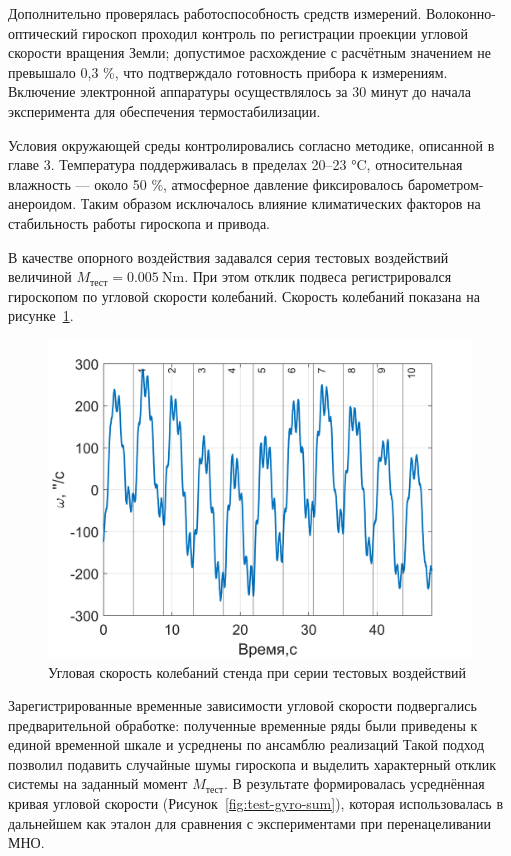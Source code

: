 Дополнительно проверялась работоспособность средств измерений. Волоконно-оптический гироскоп проходил контроль по регистрации проекции угловой скорости вращения Земли; допустимое расхождение с расчётным значением не превышало 0,3 \%, что подтверждало готовность прибора к измерениям. Включение электронной аппаратуры осуществлялось за 30 минут до начала эксперимента для обеспечения термостабилизации.

Условия окружающей среды контролировались согласно методике, описанной в главе 3. Температура поддерживалась в пределах 20–23 °C, относительная влажность — около 50 \%, атмосферное давление фиксировалось барометром-анероидом. Таким образом исключалось влияние климатических факторов на стабильность работы гироскопа и привода.

В качестве опорного воздействия задавался серия тестовых воздействий величиной $M_{\text{тест}} = \SI{0,005}{\newton\meter}$. При этом отклик подвеса регистрировался гироскопом по угловой скорости колебаний. Скорость колебаний показана на рисунке~\cref{fig:test-gyro}.

\begin{figure}[h!]
	\centering
	\includegraphics[scale=0.8]{matlab/img/test-gyro}
	\caption{Угловая скорость колебаний стенда при серии тестовых воздействий}
	\label{fig:test-gyro}
\end{figure}

Зарегистрированные временные зависимости угловой скорости подвергались предварительной обработке: полученные временные ряды были приведены к единой временной шкале и усреднены по ансамблю реализаций Такой подход позволил подавить случайные шумы гироскопа и выделить характерный отклик системы на заданный момент $M_{\text{тест}}$. В результате формировалась усреднённая кривая угловой скорости (Рисунок~\cref{fig:test-gyro-sum}), которая использовалась в дальнейшем как эталон для сравнения с экспериментами при перенацеливании МНО.

